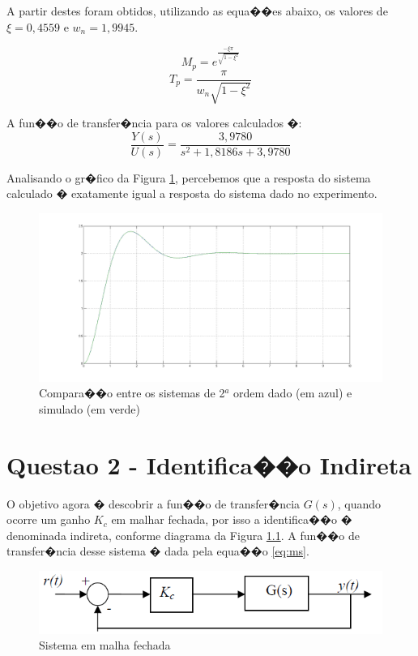 \documentclass[11pt,a4paper]{report}
\begin{document}
	 A partir destes foram obtidos, utilizando as equa��es abaixo, os valores de $\xi = 0,4559$ e $w_{n} = 1,9945$.  
	 
	 \[ M_{p} = e^{\frac{-\xi\pi}{\sqrt{1 - \xi^{2}}}}\] \[ T_{p} = \frac{\pi}{w_{n}\sqrt{1-\xi^{2}}}\]
	 
	A fun��o de transfer�ncia para os valores calculados �:
		\[ \frac{Y(s)}{U(s)} = \frac{3,9780}{s^{2}+1,8186s+3,9780}\]	 
		
	Analisando o gr�fico da Figura \ref{fig:sist2ordcomparacao}, percebemos que a resposta do sistema calculado � exatamente igual a resposta do sistema dado no experimento.
	
		\begin{figure}[h]
			\centering
			\includegraphics[scale=0.35]{./pictures/2ordem_direta_comparacao.png}
			\caption{Compara��o entre os sistemas de 2$^{a}$ ordem dado (em azul) e simulado (em verde)}
			\label{fig:sist2ordcomparacao}			
		\end{figure}	

\chapter{Questao 2 - Identifica��o Indireta}

O objetivo agora � descobrir a fun��o de transfer�ncia $G(s)$, quando ocorre um ganho $K_{c}$ em malhar fechada, por isso a identifica��o � denominada indireta, conforme diagrama da Figura \ref{fig:sistmalhafechada}. A fun��o de transfer�ncia desse sistema � dada pela equa��o \ref{eq:ms}.

		\begin{figure}[h]
			\centering
			\includegraphics[scale=0.75]{./pictures/sist_malha_fechada.png}
			\caption{Sistema em malha fechada}
			\label{fig:sistmalhafechada}			
		\end{figure}
		
\end{document}
